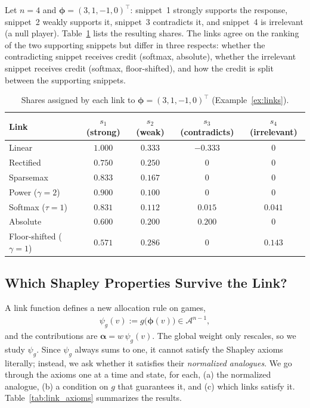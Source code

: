 \begin{example}\label{ex:links}
Let $n = 4$ and $\boldsymbol{\phi} = (3, 1, -1, 0)^\top$: snippet~1 strongly supports the response, snippet~2 weakly supports it, snippet~3 contradicts it, and snippet~4 is irrelevant (a null player). Table~\ref{tab:link_example} lists the resulting shares. The links agree on the ranking of the two supporting snippets but differ in three respects: whether the contradicting snippet receives credit (softmax, absolute), whether the irrelevant snippet receives credit (softmax, floor-shifted), and how the credit is split between the supporting snippets.
\end{example}

\begin{table}[h]
\centering
\small
\begin{tabular}{lcccc}
\hline
\textbf{Link} & $s_1$ (strong) & $s_2$ (weak) & $s_3$ (contradicts) & $s_4$ (irrelevant) \\ \hline
Linear                       & $1.000$ & $0.333$ & $-0.333$ & $0$ \\
Rectified                    & $0.750$ & $0.250$ & $0$      & $0$ \\
Sparsemax                    & $0.833$ & $0.167$ & $0$      & $0$ \\
Power ($\gamma = 2$)         & $0.900$ & $0.100$ & $0$      & $0$ \\
Softmax ($\tau = 1$)         & $0.831$ & $0.112$ & $0.015$  & $0.041$ \\
Absolute                     & $0.600$ & $0.200$ & $0.200$  & $0$ \\
Floor-shifted ($\gamma = 1$) & $0.571$ & $0.286$ & $0$      & $0.143$ \\ \hline
\end{tabular}
\caption{Shares assigned by each link to $\boldsymbol{\phi} = (3, 1, -1, 0)^\top$ (Example~\ref{ex:links}).}
\label{tab:link_example}
\end{table}

\subsection{Which Shapley Properties Survive the Link?}
\label{subsec:link_axioms}

A link function defines a new allocation rule on games,
\begin{align}
    \psi_g(v) := g\big(\boldsymbol{\phi}(v)\big) \in \mathcal{A}^{n-1},
\end{align}
and the contributions are $\boldsymbol{\alpha} = w\, \psi_g(v)$. The global weight only rescales, so we study $\psi_g$. Since $\psi_g$ always sums to one, it cannot satisfy the Shapley axioms literally; instead, we ask whether it satisfies their \emph{normalized analogues}. We go through the axioms one at a time and state, for each, (a) the normalized analogue, (b) a condition on $g$ that guarantees it, and (c) which links satisfy it. Table~\ref{tab:link_axioms} summarizes the results.

